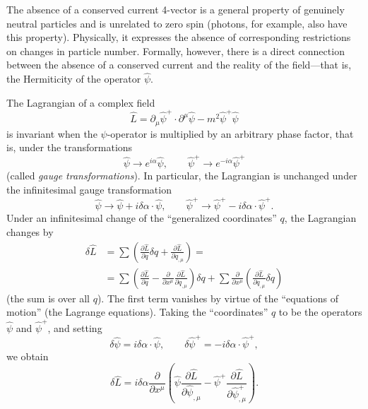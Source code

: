 The absence of a conserved current 4-vector is a general property of genuinely neutral particles and is unrelated to zero spin (photons, for example, also have this property). Physically, it expresses the absence of corresponding restrictions on changes in particle number. Formally, however, there is a direct connection between the absence of a conserved current and the reality of the field---that is, the Hermiticity of the operator $\widehat\psi$.

The Lagrangian of a complex field
\begin{equation}
\widehat L=\partial_\mu\widehat\psi^+\cdot
\partial^\mu\widehat\psi-m^2\widehat\psi^+\widehat\psi
\tag{12.9}
\end{equation}
is invariant when the $\psi$-operator is multiplied by an arbitrary phase factor, that is, under the transformations
\begin{equation}
\widehat\psi\to e^{i\alpha}\widehat\psi,
\qquad
\widehat\psi^+\to e^{-i\alpha}\widehat\psi^+
\tag{12.10}
\end{equation}
(called \emph{gauge transformations}). In particular, the Lagrangian is unchanged under the infinitesimal gauge transformation
\begin{equation}
\widehat\psi\to\widehat\psi+i\delta\alpha\cdot\widehat\psi,
\qquad
\widehat\psi^+\to\widehat\psi^+-i\delta\alpha\cdot\widehat\psi^+.
\tag{12.11}
\end{equation}
Under an infinitesimal change of the ``generalized coordinates'' $q$, the Lagrangian changes by
\begin{align*}
\delta\widehat L
&=\sum\left(
\frac{\partial\widehat L}{\partial q}\delta q
+\frac{\partial\widehat L}{\partial q_{,\mu}}
\right)={}\\
&=\sum\left(
\frac{\partial\widehat L}{\partial q}
-\frac{\partial}{\partial x^\mu}
\frac{\partial\widehat L}{\partial q_{,\mu}}
\right)\delta q
+\sum\frac{\partial}{\partial x^\mu}
\left(\frac{\partial\widehat L}{\partial q_{,\mu}}\delta q\right)
\end{align*}
(the sum is over all $q$). The first term vanishes by virtue of the ``equations of motion'' (the Lagrange equations). Taking the ``coordinates'' $q$ to be the operators $\widehat\psi$ and $\widehat\psi^+$, and setting
\[
\delta\widehat\psi=i\delta\alpha\cdot\widehat\psi,
\qquad
\delta\widehat\psi^+=-i\delta\alpha\cdot\widehat\psi^+,
\]
we obtain
\[
\delta\widehat L=i\delta\alpha\frac{\partial}{\partial x^\mu}
\left(
\widehat\psi\frac{\partial\widehat L}{\partial\widehat\psi_{,\mu}}
-\widehat\psi^+\frac{\partial\widehat L}{\partial\widehat\psi^+_{,\mu}}
\right).
\]

